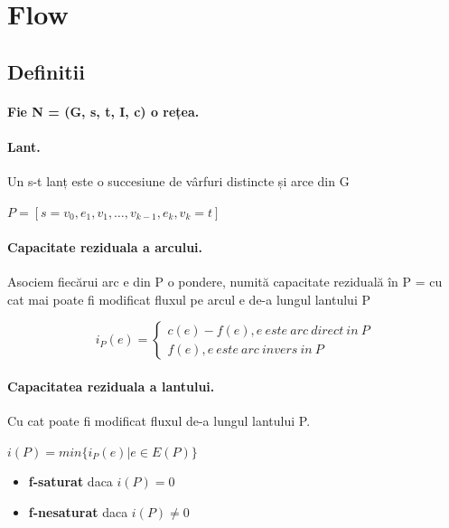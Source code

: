\documentclass{article}
\begin{document}
\section{Flow}
\subsection*{Definitii}
\paragraph*{Fie N = (G, {s}, {t}, I, c) o rețea.}
\paragraph*{Lant.} Un s-t lanț este o succesiune de vârfuri distincte și arce din G
\begin{center}
    $P = [ s=v_0, e_1, v_1, …, v_{k-1}, e_k, v_k=t ]$
\end{center}
\paragraph*{Capacitate reziduala a arcului.} Asociem fiecărui arc e din P o pondere, numită capacitate reziduală în P = cu cat mai poate fi modificat fluxul pe arcul e de-a lungul lantului P
\begin{center}
    \[
        i_P(e) = \left\{
        \begin{array}{ll}
            c(e) - f(e), e \ este \ arc \ direct \ in \ P \\
            f(e), e \ este \ arc \ invers \ in \ P
        \end{array}
        \right.
    \]
\end{center}

\paragraph*{Capacitatea reziduala a lantului.} Cu cat poate fi modificat fluxul de-a lungul lantului P.
\begin{center}
    $i(P) = min \{i_P(e) | e \in E(P)\}$
\end{center}
\begin{itemize}
    \item \textbf{f-saturat} daca $i(P)=0$
    \item \textbf{f-nesaturat} daca $i(P) \neq 0$
\end{itemize}
\end{document}

